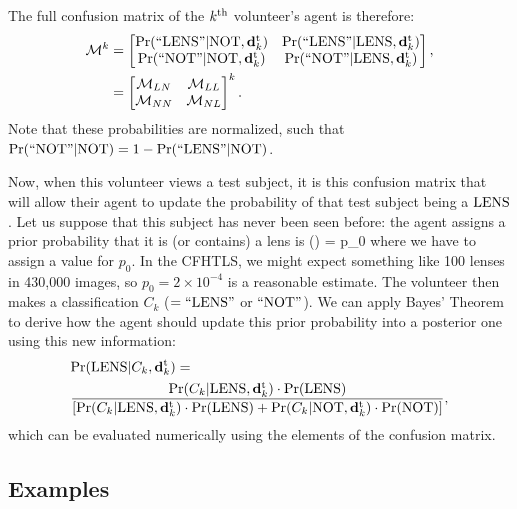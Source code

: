 \documentclass[useAMS,usenatbib,a4paper]{mn2e}
\begin{document}
The full confusion matrix of the $k^{\rm th}$ volunteer's agent is therefore:
\begin{align}
  \mathcal{M}^k &=
  \begin{bmatrix}
    {\rm Pr}({\rm ``LENS"}|{\rm NOT},{\mathbf{d}^{\rm t}_k}) & {\rm Pr}({\rm ``LENS"}|{\rm LENS},{\mathbf{d}^{\rm t}_k}) \\
    {\rm Pr}({\rm ``NOT"} |{\rm NOT},{\mathbf{d}^{\rm t}_k}) & {\rm Pr}({\rm ``NOT"} |{\rm LENS},{\mathbf{d}^{\rm t}_k})
  \end{bmatrix}, \notag \\
        &=
  \begin{bmatrix}
    \mathcal{M}_{LN} & \mathcal{M}_{LL} \\
    \mathcal{M}_{NN} & \mathcal{M}_{NL}
  \end{bmatrix}^k.
  \label{eq:confmat}
\end{align}
Note that these probabilities are normalized, such that
${\rm Pr}({\rm ``NOT"} |{\rm NOT}) = 1 - {\rm Pr}({\rm ``LENS"}|{\rm NOT})$.

Now, when this volunteer views a test subject,
it is this confusion matrix that will allow their agent to update the
probability of that test subject being a ${\rm LENS}$. Let us suppose that
this subject has never been seen before: the agent assigns a
prior probability that it is (or contains) a lens is
\be
  \pr(\LENS) = p_0
\ee
where we have to assign a value for $p_0$. In the CFHTLS, we might expect
something like 100 lenses in 430,000 images, so $p_0 = 2\times10^{-4}$
is a reasonable estimate. The volunteer then makes a classification $C_k$
($= {\rm ``LENS"}$ or ${\rm ``NOT"}$).
We can apply Bayes' Theorem to derive how the agent should
update this prior probability into a posterior one using this new information:
\begin{align}
  \label{eq:app:first}
  & {\rm Pr}({\rm LENS}|C_k,{\mathbf{d}^{\rm t}_k}) = \\
  & \frac{{\rm Pr}(C_k|{\rm LENS},{\mathbf{d}^{\rm t}_k})\cdot{\rm Pr}({\rm LENS})}
{\left[ {\rm Pr}(C_k|{\rm LENS},{\mathbf{d}^{\rm t}_k})\cdot{\rm Pr}({\rm LENS}) + {\rm Pr}(C_k|{\rm NOT},{\mathbf{d}^{\rm t}_k})\cdot{\rm Pr}({\rm NOT}) \right]},
  \notag
\end{align}
which can be evaluated numerically using the elements of the confusion
matrix.

\subsection{Examples}
\label{appendix:swap:examples}
\end{document}
